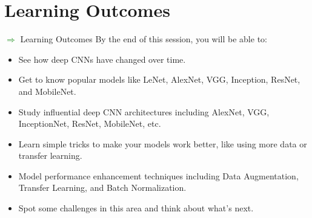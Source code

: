 \section{Learning Outcomes}
\begin{frame}[allowframebreaks]{\textcolor{green}{$\Rightarrow$} Learning Outcomes}
    By the end of this session, you will be able to:
        \begin{itemize}
            \item See how deep CNNs have changed over time.
            \item Get to know popular models like LeNet, AlexNet, VGG, Inception, ResNet, and MobileNet.
            \item Study influential deep CNN architectures including AlexNet, VGG, InceptionNet, ResNet, MobileNet, etc.
            \item Learn simple tricks to make your models work better, like using more data or transfer learning.
            \item Model performance enhancement techniques including Data Augmentation, Transfer Learning, and Batch Normalization.
            \item Spot some challenges in this area and think about what’s next.
        \end{itemize}
\end{frame}